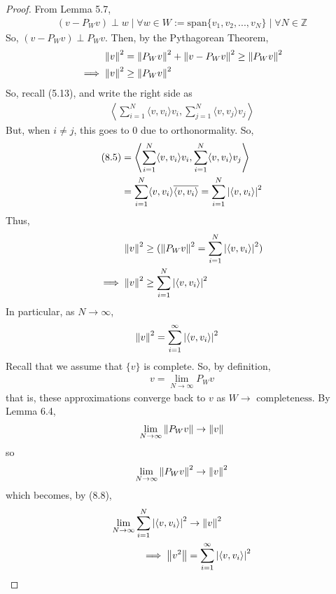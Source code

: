 \begin{proof}
    From Lemma 5.7,
    \begin{align}
        (v - P_Wv) \perp w \mid \forall w \in W:= \text{span} \{v_1, v_2, ..., v_N\} \mid \forall N \in \mathbb{Z}
    \end{align}
    So, $(v - P_Wv) \perp P_W v$. Then, by the Pythagorean Theorem,
    \begin{align}
        \norm{v}^2 &= \norm{P_Wv}^2 + \norm{v - P_Wv}^2 \ge \norm{P_Wv}^2\\
        \implies \norm{v}^2 &\ge \norm{P_Wv}^2
    \end{align}
    So, recall (5.13), and write the right side as
    \begin{align}
        \left\langle \sum_{i=1}^N \langle v, v_i \rangle v_i, \sum_{j=1}^N \langle v, v_j \rangle v_j \right\rangle
    \end{align}
    But, when $i \ne j$, this goes to $0$ due to orthonormality. So,
    \begin{align}
        (8.5) &= \left\langle \sum_{i=1}^N \langle v, v_i \rangle v_i, \sum_{i=1}^N \langle v, v_i \rangle v_j \right\rangle\\
        &= \sum_{i=1}^N \langle v, v_i \rangle \overline{\langle v, v_i \rangle} = \sum_{i=1}^N \abs{\langle v, v_i \rangle}^2
    \end{align}
    Thus, 
    \begin{align}
        \norm{v}^2 &\ge (\norm{P_Wv}^2 = \sum_{i=1}^N \abs{\langle v, v_i \rangle}^2 )\\
        \implies \norm{v}^2 &\ge \sum_{i=1}^N \abs{\langle v, v_i \rangle}^2
    \end{align}
    In particular, as $N \to \infty$,
    \begin{align}
        \norm{v}^2 &= \sum_{i=1}^\infty \abs{\langle v, v_i \rangle}^2
    \end{align}
    Recall that we assume that $\{ v \}$ is complete. So, by definition,
    \begin{align}
        v = \lim_{N \to \infty} P_W v
    \end{align}
    that is, these approximations converge back to $v$ as $W \to \text{ completeness}$. By Lemma 6.4,
    \begin{align}
        \lim_{N \to \infty} \norm{P_W v} \to \norm{v}
    \end{align}
    so
    \begin{align}
        \lim_{N \to \infty} \norm{P_W v}^2 \to \norm{v}^2
    \end{align}
    which becomes, by (8.8),
    \begin{align}
        \lim_{N \to \infty} \sum_{i=1}^N \abs{\langle v, v_i \rangle}^2 &\to \norm{v}^2\\
        \implies \norm{v^2} &= \sum_{i=1}^\infty \abs{\langle v, v_i \rangle}^2
    \end{align}
\end{proof}

